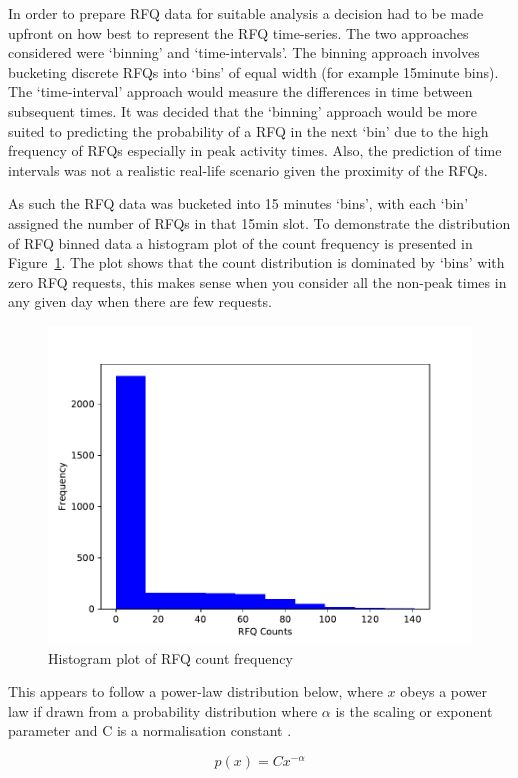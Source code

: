 In order to prepare RFQ data for suitable analysis a decision had to be made upfront on how best to represent the RFQ time-series. The two approaches considered were `binning' and `time-intervals'. The binning approach involves bucketing discrete RFQs into `bins' of equal width (for example 15minute bins). The `time-interval' approach would measure the differences in time between subsequent times. It was decided that the `binning' approach would be more suited to predicting the probability of a RFQ in the next `bin' due to the high frequency of RFQs especially in peak activity times. Also, the prediction of time intervals was not a realistic real-life scenario given the proximity of the RFQs.

As such the RFQ data was bucketed into 15 minutes `bins', with each `bin' assigned the number of RFQs in that 15min slot. To demonstrate the distribution of RFQ binned data a histogram plot of the count frequency is presented in Figure~\ref{Ch3Fig:1}. The plot shows that the count distribution is dominated by `bins' with zero RFQ requests, this makes sense when you consider all the non-peak times in any given day when there are few requests. 

\begin{figure}[!ht]\centering
    \includegraphics[width=0.8\linewidth]{./figures/Ch6fig1.pdf}
    \caption{Histogram plot of RFQ count frequency}\label{Ch3Fig:1}
\end{figure}

This appears to follow a power-law distribution below, where $x$ obeys a power law if drawn from a probability distribution where $\alpha$ is the scaling or exponent parameter and C is a normalisation constant \autocite{clauset2009power}.

\begin{equation}\label{Ch6Eq1}
    p(x) = C x^{-\alpha}
\end{equation}

